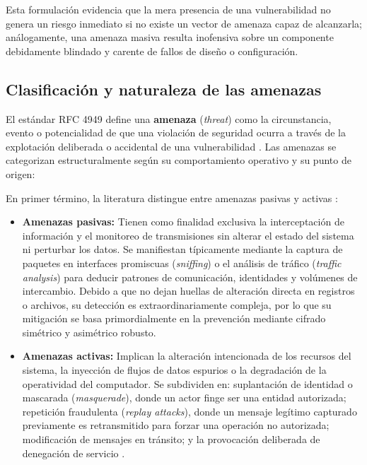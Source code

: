 \documentclass[12pt]{article}
\begin{document}
Esta formulación evidencia que la mera presencia de una vulnerabilidad no genera un riesgo inmediato si no existe un vector de amenaza capaz de alcanzarla; análogamente, una amenaza masiva resulta inofensiva sobre un componente debidamente blindado y carente de fallos de diseño o configuración.

\subsection{Clasificación y naturaleza de las amenazas}\label{subsec:clasificacionNaturalezaAmenazas}

El estándar RFC 4949 define una \textbf{amenaza} (\textit{threat}) como la circunstancia, evento o potencialidad de que una violación de seguridad ocurra a través de la explotación deliberada o accidental de una vulnerabilidad \parencite[\S 2, p.\ 298]{rfc4949}. Las amenazas se categorizan estructuralmente según su comportamiento operativo y su punto de origen:

En primer término, la literatura distingue entre amenazas pasivas y activas \parencite[\S 15.1, p.\ 509]{silberschatz2006fundamentos}:
\begin{itemize}[noitemsep, topsep=2pt]
    \item \textbf{Amenazas pasivas:} Tienen como finalidad exclusiva la interceptación de información y el monitoreo de transmisiones sin alterar el estado del sistema ni perturbar los datos. Se manifiestan típicamente mediante la captura de paquetes en interfaces promiscuas (\textit{sniffing}) o el análisis de tráfico (\textit{traffic analysis}) para deducir patrones de comunicación, identidades y volúmenes de intercambio. Debido a que no dejan huellas de alteración directa en registros o archivos, su detección es extraordinariamente compleja, por lo que su mitigación se basa primordialmente en la prevención mediante cifrado simétrico y asimétrico robusto.
    \item \textbf{Amenazas activas:} Implican la alteración intencionada de los recursos del sistema, la inyección de flujos de datos espurios o la degradación de la operatividad del computador. Se subdividen en: suplantación de identidad o mascarada (\textit{masquerade}), donde un actor finge ser una entidad autorizada; repetición fraudulenta (\textit{replay attacks}), donde un mensaje legítimo capturado previamente es retransmitido para forzar una operación no autorizada; modificación de mensajes en tránsito; y la provocación deliberada de denegación de servicio \parencite[\S 15.1, p.\ 510]{silberschatz2006fundamentos}.
\end{itemize}
\end{document}
